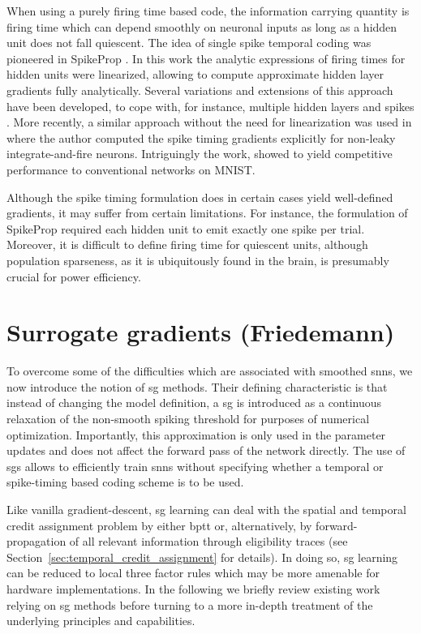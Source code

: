 \documentclass[journal,onecolumn,11pt]{IEEEtran}
\begin{document}
When using a purely firing time based code, the information carrying quantity is
firing time which can depend smoothly on neuronal inputs as long as a hidden
unit does not fall quiescent.
The idea of single spike temporal coding was 
pioneered in SpikeProp \cite{bohte_error-backpropagation_2002}.
In this work the analytic expressions of firing times for hidden units 
were linearized, allowing to compute approximate hidden layer gradients fully
analytically. 
Several variations and extensions of this approach have been developed,
to cope with, for instance, multiple hidden layers and spikes
\cite{banerjee_learning_2016}. %
More recently, a similar approach without the need for linearization 
was used in \cite{Mostafa16_supelear} where the author computed the spike timing 
gradients explicitly for non-leaky integrate-and-fire neurons. 
Intriguingly the work, showed to yield competitive performance to conventional
networks on MNIST.

Although the spike timing formulation does in certain cases
yield well-defined gradients, it may suffer from certain
limitations. 
For instance, the formulation of SpikeProp required each hidden
unit to emit exactly one spike per trial. Moreover, it is difficult to define 
firing time for quiescent units, although population sparseness, as it is
ubiquitously found in the brain, is presumably crucial for power
efficiency.


\section{Surrogate gradients (Friedemann)}

To overcome some of the difficulties which are associated with 
smoothed \glspl{snn}, we now introduce the notion of \gls{sg} methods.
Their defining characteristic is that
instead of changing the model definition,
a \gls{sg} is introduced as a continuous relaxation of the non-smooth
spiking threshold for purposes of numerical optimization.
Importantly, this approximation is only used in the parameter updates and does
not affect the forward pass of the network directly.
The use of \glspl{sg} allows to efficiently train \glspl{snn} without specifying whether a temporal or spike-timing based coding scheme is to be used. 

Like vanilla gradient-descent, \gls{sg} learning can deal with the spatial and
temporal credit assignment problem by either \gls{bptt} or,
alternatively, by forward-propagation of all relevant information through
eligibility traces (see Section~\ref{sec:temporal_credit_assignment} for details). 
In doing so, \gls{sg} learning can be reduced to local three factor rules which
may be more amenable for hardware implementations. 
In the following we briefly review existing work relying on \gls{sg} methods
before turning to a more in-depth treatment of the underlying principles and
capabilities. 
\end{document}
